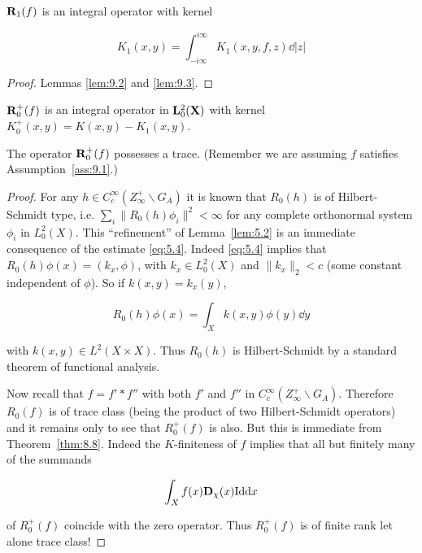 \begin{proposition}\label{prop:9.4}

$\mathbf{R}_1(f)$ is an integral operator with kernel

\begin{equation}\label{eq:9.24}
K_1(x, y) = \int_{-i\infty}^{i\infty} K_1(x, y, f, z)\dd|z|\tag{9.24}
\end{equation}

\end{proposition}

\begin{proof}

Lemmas \ref{lem:9.2} and \ref{lem:9.3}.

\end{proof}

\begin{corollary}\label{cor:9.5}

$\mathbf{R}_0^{+}(f)$ is an integral operator in $\mathbf{L}_0^2(\mathbf{X})$ with kernel $K_0^{+}(x, y) = K(x, y) - K_1(x, y)$.

\end{corollary}

\begin{proposition}\label{prop:9.6}

The operator $\mathbf{R}_0^{+}(f)$ possesses a trace. (Remember we are assuming $f$ satisfies Assumption~\ref{ass:9.1}.)

\end{proposition}

\begin{proof}

For any $h \in C_c^\infty(Z_\infty^{+} \backslash G_A)$ it is known that $R_0(h)$ is of Hilbert-Schmidt type, i.e. $\sum_i \|R_0(h)\phi_i\|^2 < \infty$ for any complete orthonormal system $\phi_i$ in $L_0^2(X)$. This ``refinement'' of Lemma~\ref{lem:5.2} is an immediate consequence of the estimate \eqref{eq:5.4}. Indeed \eqref{eq:5.4} implies that $R_0(h)\phi(x) = (k_x, \phi)$, with $k_x \in L_0^2(X)$ and $\|k_x\|_2 < c$ (some constant independent of $\phi$). So if $k(x, y) = k_x(y)$,

\[
R_0(h)\phi(x) = \int_X k(x, y)\phi(y)\dd y
\]

with $k(x, y) \in L^2(X \times X)$. Thus $R_0(h)$ is Hilbert-Schmidt by a standard theorem of functional analysis.

Now recall that $f = f' * f''$ with both $f'$ and $f''$ in $C_c^\infty(Z_\infty^{+} \backslash G_A)$. Therefore $R_0(f)$ is of trace class (being the product of two Hilbert-Schmidt operators) and it remains only to see that $R_0^{+}(f)$ is also. But this is immediate from Theorem~\ref{thm:8.8}. Indeed the $K$-finiteness of $f$ implies that all but finitely many of the summands

\[
\int_X f(x)\mathbf{D}_\chi(x)\mathrm{Id}\mathrm{d} x
\]

of $R_0^{+}(f)$ coincide with the zero operator. Thus $R_0^{+}(f)$ is of finite rank let alone trace class!

\end{proof}

